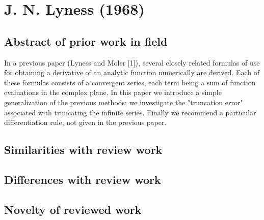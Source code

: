 \documentclass[10pt,letterpaper,draft]{article}
\begin{document}
\section{J. N. Lyness (1968)}
\subsection{Abstract of prior work in field}

In a previous paper (Lyness and Moler [1]), several closely related formulas of
use for obtaining a derivative of an analytic function numerically are derived.
Each of these formulas consists of a convergent series, each term being a sum
of function evaluations in the complex plane.  In this paper we introduce a
simple generalization of the previous methods; we investigate the "truncation
error" associated with truncating the infinite series.  Finally we recommend a
particular differentiation rule, not given in the previous paper.

\subsection{Similarities with review work}
\subsection{Differences with review work}
\subsection{Novelty of reviewed work}
\end{document}
